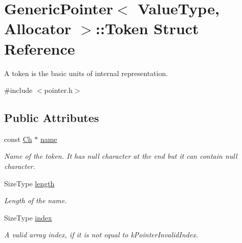 \hypertarget{struct_generic_pointer_1_1_token}{}\section{Generic\+Pointer$<$ Value\+Type, Allocator $>$\+:\+:Token Struct Reference}
\label{struct_generic_pointer_1_1_token}


A token is the basic units of internal representation.  




{\ttfamily \#include $<$pointer.\+h$>$}

\subsection*{Public Attributes}
\begin{DoxyCompactItemize}
\item 
const \hyperlink{class_generic_pointer_ab292356c11b4015c98d21b966b11f285}{Ch} $\ast$ \hyperlink{struct_generic_pointer_1_1_token_a67d52356431b4dbb035edf7ccde0bdbd}{name}\hypertarget{struct_generic_pointer_1_1_token_a67d52356431b4dbb035edf7ccde0bdbd}{}\label{struct_generic_pointer_1_1_token_a67d52356431b4dbb035edf7ccde0bdbd}

\begin{DoxyCompactList}\small\item\em Name of the token. It has null character at the end but it can contain null character. \end{DoxyCompactList}\item 
Size\+Type \hyperlink{struct_generic_pointer_1_1_token_a67383574032a3289d34002bb2d95df6d}{length}\hypertarget{struct_generic_pointer_1_1_token_a67383574032a3289d34002bb2d95df6d}{}\label{struct_generic_pointer_1_1_token_a67383574032a3289d34002bb2d95df6d}

\begin{DoxyCompactList}\small\item\em Length of the name. \end{DoxyCompactList}\item 
Size\+Type \hyperlink{struct_generic_pointer_1_1_token_a0ce571cfe3f3da942a5912bb2cd24dcf}{index}\hypertarget{struct_generic_pointer_1_1_token_a0ce571cfe3f3da942a5912bb2cd24dcf}{}\label{struct_generic_pointer_1_1_token_a0ce571cfe3f3da942a5912bb2cd24dcf}

\begin{DoxyCompactList}\small\item\em A valid array index, if it is not equal to k\+Pointer\+Invalid\+Index. \end{DoxyCompactList}\end{DoxyCompactItemize}


